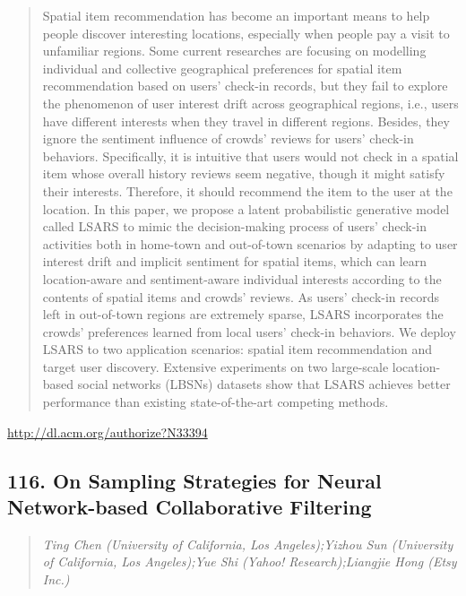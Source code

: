 \documentclass{article}
\begin{document}
\begin{quote}
Spatial item recommendation has become an important means to help people discover interesting locations, especially when people pay a visit to unfamiliar regions. Some current researches are focusing on modelling individual and collective geographical preferences for spatial item recommendation based on users’ check-in records, but they fail to explore the phenomenon of user interest drift across geographical regions, i.e., users have different interests when they travel in different regions. Besides, they ignore the sentiment influence of crowds’ reviews for users’ check-in behaviors. Specifically, it is intuitive that users would not check in a spatial item whose overall history reviews seem negative, though it might satisfy their interests. Therefore, it should recommend the item to the user at the location. In this paper, we propose a latent probabilistic generative model called LSARS to mimic the decision-making process of users’ check-in activities both in home-town and out-of-town scenarios by adapting to user interest drift and implicit sentiment for spatial items, which can learn location-aware and sentiment-aware individual interests according to the contents of spatial items and crowds’ reviews. As users’ check-in records left in out-of-town regions are extremely sparse, LSARS incorporates the crowds’ preferences learned from local users’ check-in behaviors. We deploy LSARS to two application scenarios: spatial item recommendation and target user discovery. Extensive experiments on two large-scale location-based social networks (LBSNs) datasets show that LSARS achieves better performance than existing state-of-the-art competing methods.
\end{quote}

\href{http://dl.acm.org/authorize?N33394}{http://dl.acm.org/authorize?N33394}

\subsection{116. On Sampling Strategies for Neural Network-based Collaborative Filtering}

\begin{quote}
\footnotesize{\textit{Ting Chen (University of California, Los Angeles);Yizhou Sun (University of California, Los Angeles);Yue Shi (Yahoo! Research);Liangjie Hong (Etsy Inc.)}}

\end{quote}
\end{document}
